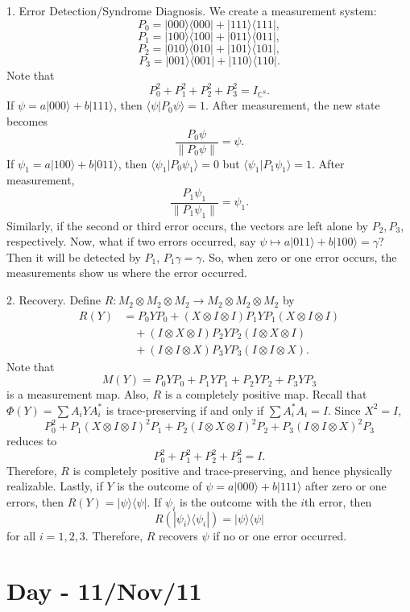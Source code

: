 \documentclass[12pt]{article}
\theoremstyle{definition}
\newcommand{\C}{\mathbb{C}}
\begin{document}
1. Error Detection/Syndrome Diagnosis. We create a measurement system:
\[
P_0 = |000\rangle\langle 000| + |111\rangle\langle 111|,
\]
\[
P_1 = |100\rangle\langle 100| + |011\rangle\langle 011|,
\]
\[
P_2 = |010\rangle\langle 010| + |101\rangle\langle 101|,
\]
\[
P_3 = |001\rangle\langle 001| + |110\rangle\langle 110|.
\]
Note that
\[
P_0^2+P_1^2+P_2^2+P_3^2 = I_{\C^8}.
\]
If $\psi=a|000\rangle+b|111\rangle$, then $\langle \psi|P_0\psi\rangle=1$. After measurement, the new state becomes
\[
\frac{P_0\psi}{\|P_0\psi\|}=\psi.
\]
If $\psi_1=a|100\rangle+b|011\rangle$, then $\langle \psi_1|P_0\psi_1\rangle=0$ but $\langle \psi_1|P_1\psi_1\rangle=1$. After measurement,
\[
\frac{P_1\psi_1}{\|P_1\psi_1\|}=\psi_1.
\]
Similarly, if the second or third error occurs, the vectors are left alone by $P_2,P_3$, respectively. Now, what if two errors occurred, say $\psi \mapsto a|011\rangle+b|100\rangle=\gamma$? Then it will be detected by $P_1$, $P_1\gamma=\gamma$. So, when zero or one error occurs, the measurements show us where the error occurred.

2. Recovery. Define $R:M_2 \otimes M_2 \otimes M_2 \to M_2 \otimes M_2 \otimes M_2$ by
\begin{align*}
R(Y) &= P_0YP_0 + (X \otimes I \otimes I)P_1YP_1(X \otimes I \otimes I) \\
&\quad + (I \otimes X \otimes I)P_2YP_2(I \otimes X \otimes I) \\
&\quad + (I \otimes I \otimes X)P_3YP_3(I \otimes I \otimes X).
\end{align*}
Note that
\[
M(Y)=P_0YP_0+P_1YP_1+P_2YP_2+P_3YP_3
\]
is a measurement map. Also, $R$ is a completely positive map. Recall that $\Phi(Y)=\sum A_iYA_i^*$ is trace-preserving if and only if $\sum A_i^*A_i=I$. Since $X^2=I$,
\[
P_0^2+P_1(X\otimes I\otimes I)^2P_1+P_2(I\otimes X\otimes I)^2P_2+P_3(I\otimes I\otimes X)^2P_3
\]
reduces to
\[
P_0^2+P_1^2+P_2^2+P_3^2=I.
\]
Therefore, $R$ is completely positive and trace-preserving, and hence physically realizable. Lastly, if $Y$ is the outcome of $\psi=a|000\rangle+b|111\rangle$ after zero or one errors, then $R(Y)=|\psi\rangle\langle \psi|$. If $\psi_i$ is the outcome with the $i$th error, then
\[
R(|\psi_i\rangle\langle \psi_i|)=|\psi\rangle\langle \psi|
\]
for all $i=1,2,3$. Therefore, $R$ recovers $\psi$ if no or one error occurred.

\section{Day - 11/Nov/11}
\end{document}
